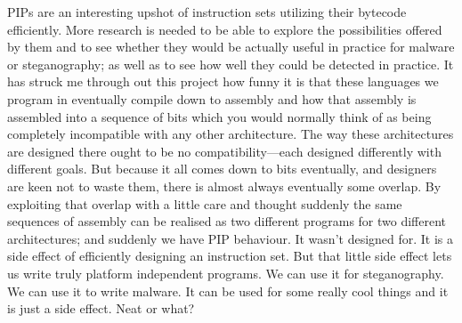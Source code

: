 \documentclass[10pt,]{book}
\begin{document}
PIPs are an interesting upshot of instruction sets utilizing their
bytecode efficiently. More research is needed to be able to explore the
possibilities offered by them and to see whether they would be actually
useful in practice for malware or steganography; as well as to see how
well they could be detected in practice. It has struck me through out
this project how funny it is that these languages we program in
eventually compile down to assembly and how that assembly is assembled
into a sequence of bits which you would normally think of as being
completely incompatible with any other architecture. The way these
architectures are designed there ought to be no compatibility---each
designed differently with different goals. But because it all comes down
to bits eventually, and designers are keen not to waste them, there is
almost always eventually some overlap. By exploiting that overlap with a
little care and thought suddenly the same sequences of assembly can be
realised as two different programs for two different architectures; and
suddenly we have PIP behaviour. It wasn't designed for. It is a side
effect of efficiently designing an instruction set. But that little side
effect lets us write truly platform independent programs. We can use it
for steganography. We can use it to write malware. It can be used for
some really cool things and it is just a side effect. Neat or what?

\appendix

\printbibliography[title=Bibliography]
\end{document}
